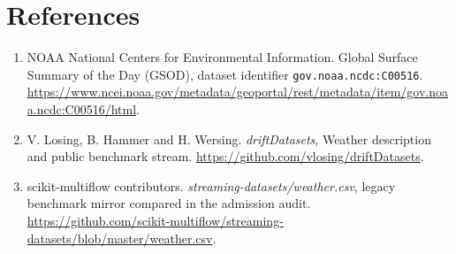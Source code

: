 \documentclass[10pt,a4paper]{article}
\begin{document}
\section*{References}
\begin{enumerate}
\item NOAA National Centers for Environmental Information. Global Surface Summary of the Day (GSOD), dataset identifier \texttt{gov.noaa.ncdc:C00516}. \url{https://www.ncei.noaa.gov/metadata/geoportal/rest/metadata/item/gov.noaa.ncdc:C00516/html}.
\item V. Losing, B. Hammer and H. Wersing. \emph{driftDatasets}, Weather description and public benchmark stream. \url{https://github.com/vlosing/driftDatasets}.
\item scikit-multiflow contributors. \emph{streaming-datasets/weather.csv}, legacy benchmark mirror compared in the admission audit. \url{https://github.com/scikit-multiflow/streaming-datasets/blob/master/weather.csv}.
\end{enumerate}
\end{document}
